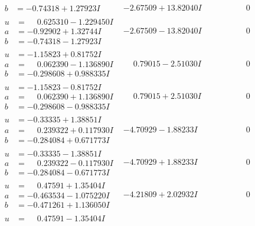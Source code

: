 \documentclass[1p]{elsarticle_modified}
\theoremstyle{definition}
\begin{document}
$$\begin{array}{c|c|c}
\begin{aligned}
b &= -0.74318 + 1.27923 I\end{aligned}
 & -2.67509 + 13.82040 I & \phantom{-0.000000 } 0 \\ \hline\begin{aligned}
u &= \phantom{-}0.625310 - 1.229450 I \\
a &= -0.92902 + 1.32744 I \\
b &= -0.74318 - 1.27923 I\end{aligned}
 & -2.67509 - 13.82040 I & \phantom{-0.000000 } 0 \\ \hline\begin{aligned}
u &= -1.15823 + 0.81752 I \\
a &= \phantom{-}0.062390 - 1.136890 I \\
b &= -0.298608 + 0.988335 I\end{aligned}
 & \phantom{-}0.79015 - 2.51030 I & \phantom{-0.000000 } 0 \\ \hline\begin{aligned}
u &= -1.15823 - 0.81752 I \\
a &= \phantom{-}0.062390 + 1.136890 I \\
b &= -0.298608 - 0.988335 I\end{aligned}
 & \phantom{-}0.79015 + 2.51030 I & \phantom{-0.000000 } 0 \\ \hline\begin{aligned}
u &= -0.33335 + 1.38851 I \\
a &= \phantom{-}0.239322 + 0.117930 I \\
b &= -0.284084 + 0.671773 I\end{aligned}
 & -4.70929 - 1.88233 I & \phantom{-0.000000 } 0 \\ \hline\begin{aligned}
u &= -0.33335 - 1.38851 I \\
a &= \phantom{-}0.239322 - 0.117930 I \\
b &= -0.284084 - 0.671773 I\end{aligned}
 & -4.70929 + 1.88233 I & \phantom{-0.000000 } 0 \\ \hline\begin{aligned}
u &= \phantom{-}0.47591 + 1.35404 I \\
a &= -0.463534 - 1.075220 I \\
b &= -0.471261 + 1.136050 I\end{aligned}
 & -4.21809 + 2.02932 I & \phantom{-0.000000 } 0 \\ \hline\begin{aligned}
u &= \phantom{-}0.47591 - 1.35404 I \\

\end{aligned}
\end{array}$$
\end{document}
